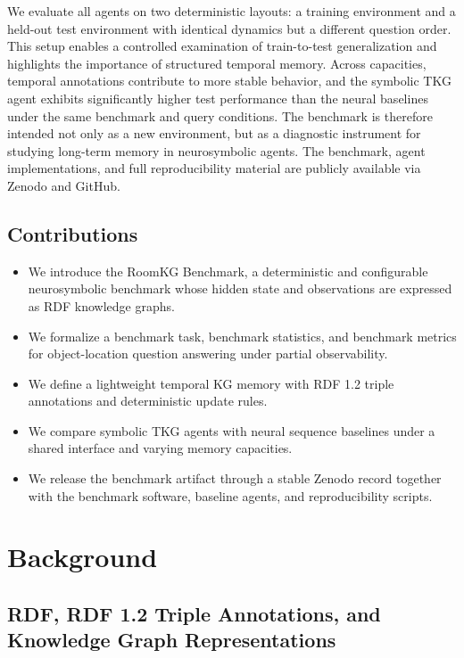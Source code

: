 \documentclass[Afour,sageh,times]{sagej}
\begin{document}
We evaluate all agents on two deterministic layouts: a training environment and a
held-out test environment with identical dynamics but a different question order. This
setup enables a controlled examination of train-to-test generalization and highlights
the importance of structured temporal memory. Across capacities, temporal annotations
contribute to more stable behavior, and the symbolic TKG agent exhibits significantly
higher test performance than the neural baselines under the same benchmark and query
conditions. The benchmark is therefore intended not only as a new environment, but as a
diagnostic instrument for studying long-term memory in neurosymbolic agents. The
benchmark, agent implementations, and full reproducibility material are publicly
available via Zenodo and GitHub.

\subsection*{Contributions}

\begin{itemize}
    \item We introduce the RoomKG Benchmark, a deterministic and configurable
        neurosymbolic benchmark whose hidden state and observations are expressed as RDF
        knowledge graphs.
    \item We formalize a benchmark task, benchmark statistics, and benchmark metrics for
    object-location question answering under partial observability.
    \item We define a lightweight temporal KG memory with RDF 1.2 triple
    annotations and deterministic update rules.
    \item We compare symbolic TKG agents with neural sequence baselines
    under a shared interface and varying memory capacities.
    \item We release the benchmark artifact through a stable Zenodo record together with
    the benchmark software, baseline agents, and reproducibility scripts.
\end{itemize}

\section{Background}

\subsection{RDF, RDF 1.2 Triple Annotations, and Knowledge Graph Representations}
\end{document}
